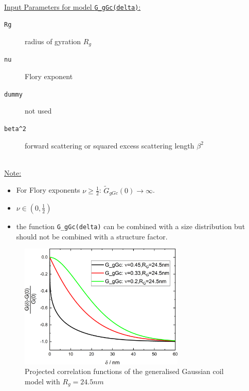 \hspace{1pt}\\
\underline{Input Parameters for model \texttt{G\_gGc(delta)}:}\\
\begin{description}
\item[\texttt{Rg}] radius of gyration $R_g$
\item[\texttt{nu}] Flory exponent
\item[\texttt{dummy}] not used
\item[\texttt{beta\^{}2}] forward scattering or squared excess scattering length $\beta^2$
\end{description}

\hspace{1pt}\\
\underline{Note:}
\begin{itemize}
\item For Flory exponents $\nu\geq \frac12$: $\tilde{G}_{gGc}(0) \rightarrow \infty$.
\item $\nu\in \left(0,\frac12\right)$
\item the function \texttt{G\_gGc(delta)} can be combined with a size distribution but should not be combined with a structure factor.
\end{itemize}

\begin{figure}[htb]
\begin{center}
\includegraphics[width=0.7\textwidth]{../images/form_factor/SESANS/G_gGc.png}
\end{center}
\caption{Projected correlation functions of the generalised Gaussian coil model with $R_g=24.5nm$}
\label{fig:G_gDAB}
\end{figure} 
